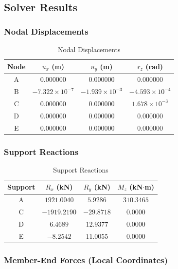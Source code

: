 \subsection{Solver Results}

\subsubsection{Nodal Displacements}

\begin{table}[H]
\centering
\caption{Nodal Displacements}
\begin{tabular}{cccc}
\toprule
Node & $u_x$ (m) & $u_y$ (m) & $r_z$ (rad) \\
\midrule
A & 0.000000 & 0.000000 & 0.000000 \\
B & $-7.322\times10^{-7}$ & $-1.939\times10^{-3}$ & $-4.593\times10^{-4}$ \\
C & 0.000000 & 0.000000 & $1.678\times10^{-3}$ \\
D & 0.000000 & 0.000000 & 0.000000 \\
E & 0.000000 & 0.000000 & 0.000000 \\
\bottomrule
\end{tabular}
\end{table}

\subsubsection{Support Reactions}

\begin{table}[H]
\centering
\caption{Support Reactions}
\begin{tabular}{cccc}
\toprule
Support & $R_x$ (kN) & $R_y$ (kN) & $M_z$ (kN$\cdot$m) \\
\midrule
A & $1921.0040$ & $5.9286$ & $310.3465$ \\
C & $-1919.2190$ & $-29.8718$ & $0.0000$ \\
D & $6.4689$ & $12.9377$ & $0.0000$ \\
E & $-8.2542$ & $11.0055$ & $0.0000$ \\
\bottomrule
\end{tabular}
\end{table}

\subsubsection{Member-End Forces (Local Coordinates)}

